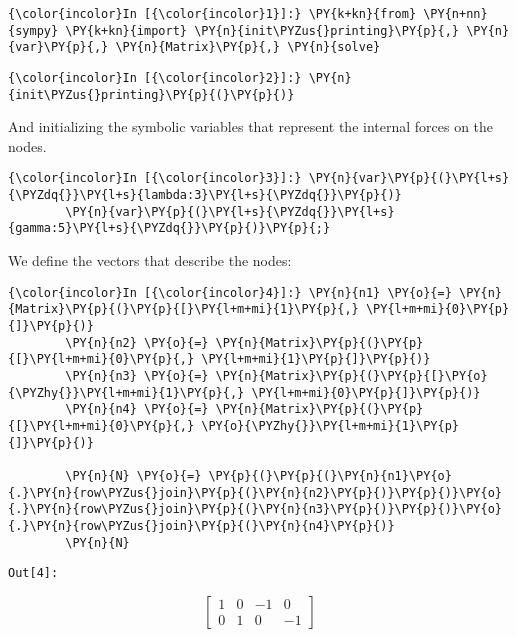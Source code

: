     \begin{Verbatim}[commandchars=\\\{\}]
{\color{incolor}In [{\color{incolor}1}]:} \PY{k+kn}{from} \PY{n+nn}{sympy} \PY{k+kn}{import} \PY{n}{init\PYZus{}printing}\PY{p}{,} \PY{n}{var}\PY{p}{,} \PY{n}{Matrix}\PY{p}{,} \PY{n}{solve}
\end{Verbatim}

    \begin{Verbatim}[commandchars=\\\{\}]
{\color{incolor}In [{\color{incolor}2}]:} \PY{n}{init\PYZus{}printing}\PY{p}{(}\PY{p}{)}
\end{Verbatim}

    And initializing the symbolic variables that represent the internal
forces on the nodes.

    \begin{Verbatim}[commandchars=\\\{\}]
{\color{incolor}In [{\color{incolor}3}]:} \PY{n}{var}\PY{p}{(}\PY{l+s}{\PYZdq{}}\PY{l+s}{lambda:3}\PY{l+s}{\PYZdq{}}\PY{p}{)}
        \PY{n}{var}\PY{p}{(}\PY{l+s}{\PYZdq{}}\PY{l+s}{gamma:5}\PY{l+s}{\PYZdq{}}\PY{p}{)}\PY{p}{;}
\end{Verbatim}

    We define the vectors that describe the nodes:

    \begin{Verbatim}[commandchars=\\\{\}]
{\color{incolor}In [{\color{incolor}4}]:} \PY{n}{n1} \PY{o}{=} \PY{n}{Matrix}\PY{p}{(}\PY{p}{[}\PY{l+m+mi}{1}\PY{p}{,} \PY{l+m+mi}{0}\PY{p}{]}\PY{p}{)}
        \PY{n}{n2} \PY{o}{=} \PY{n}{Matrix}\PY{p}{(}\PY{p}{[}\PY{l+m+mi}{0}\PY{p}{,} \PY{l+m+mi}{1}\PY{p}{]}\PY{p}{)}
        \PY{n}{n3} \PY{o}{=} \PY{n}{Matrix}\PY{p}{(}\PY{p}{[}\PY{o}{\PYZhy{}}\PY{l+m+mi}{1}\PY{p}{,} \PY{l+m+mi}{0}\PY{p}{]}\PY{p}{)}
        \PY{n}{n4} \PY{o}{=} \PY{n}{Matrix}\PY{p}{(}\PY{p}{[}\PY{l+m+mi}{0}\PY{p}{,} \PY{o}{\PYZhy{}}\PY{l+m+mi}{1}\PY{p}{]}\PY{p}{)}

        \PY{n}{N} \PY{o}{=} \PY{p}{(}\PY{p}{(}\PY{n}{n1}\PY{o}{.}\PY{n}{row\PYZus{}join}\PY{p}{(}\PY{n}{n2}\PY{p}{)}\PY{p}{)}\PY{o}{.}\PY{n}{row\PYZus{}join}\PY{p}{(}\PY{n}{n3}\PY{p}{)}\PY{p}{)}\PY{o}{.}\PY{n}{row\PYZus{}join}\PY{p}{(}\PY{n}{n4}\PY{p}{)}
        \PY{n}{N}
\end{Verbatim}
\texttt{\color{outcolor}Out[{\color{outcolor}4}]:}


        \begin{equation*}
        \left[\begin{matrix}1 & 0 & -1 & 0\\0 & 1 & 0 & -1\end{matrix}\right]
        \end{equation*}



